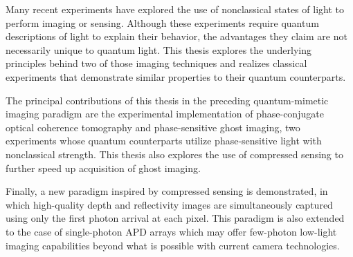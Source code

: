 Many recent experiments have explored the use of nonclassical states 
of light to perform imaging or sensing. Although these experiments
require quantum descriptions of light to explain their behavior, the advantages they
claim are not necessarily unique to quantum light. This thesis
explores the underlying principles behind two of those imaging techniques and
realizes classical experiments that demonstrate similar properties to
their quantum counterparts.

The principal contributions of this thesis in the preceding quantum-mimetic imaging paradigm
are the experimental implementation of phase-conjugate optical
coherence tomography and phase-sensitive ghost imaging, two
experiments whose quantum counterparts utilize phase-sensitive light with nonclassical strength.
This thesis also explores the use of compressed sensing to further
speed up acquisition of ghost imaging.

Finally, a new paradigm inspired by compressed sensing is
demonstrated, in which high-quality depth and reflectivity images are
simultaneously captured using only the first photon arrival at each
pixel. This paradigm is also extended to the case of single-photon APD
arrays which may offer few-photon low-light imaging capabilities
beyond what is possible with current camera technologies.
